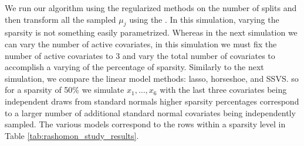 We run our algorithm using the regularized methods on the number of splits and then transform all the sampled $\mu_j$ using the \ALT. In this simulation, varying the sparsity is not something easily parametrized. Whereas in the next simulation we can vary the number of active covariates, in this simulation we must fix the number of active covariates to $3$ and vary the total number of covariates to accomplish a varying of the percentage of sparsity. Similarly to the next simulation, we compare the linear model methods: lasso, horseshoe, and SSVS. so for a sparsity of 50\% we simulate $x_1, \dots, x_6$ with the last three covariates being independent draws from standard normals higher sparsity percentages correspond to a larger number of additional standard normal covariates being independently sampled. The various models correspond to the rows within a sparsity level in Table \ref{tab:rashomon_study_results}.  

